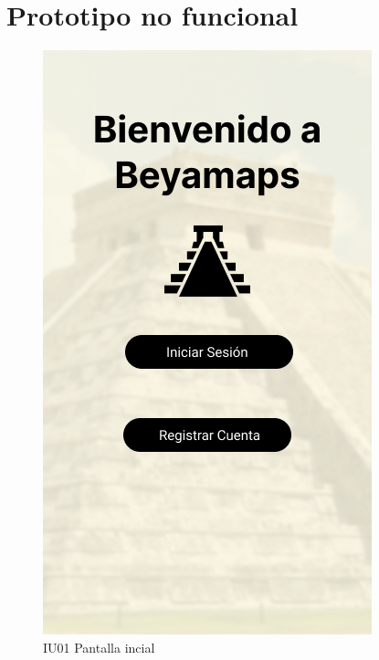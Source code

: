 \section{Prototipo no funcional}
\begin{figure}[h]
    \begin{minipage}{0.4\textwidth}
        \centering
        \includegraphics[width=.7\linewidth]{Pantallas Prototipo3/IU01 Pantalla incial.jpg}
        \caption{IU01 Pantalla incial}
    \end{minipage}
    

\end{figure}
